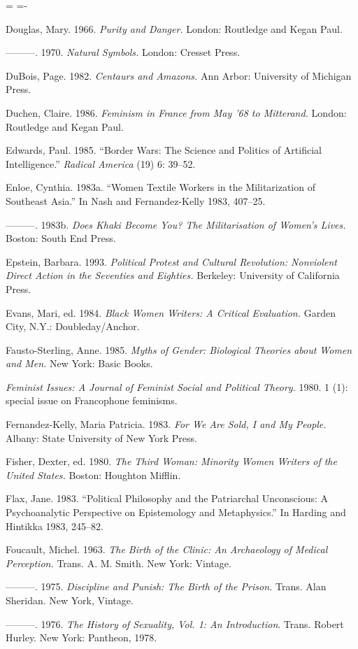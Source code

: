 \documentclass[DIV=12,%
               BCOR=10mm,%
               headinclude=false,%
               footinclude=false,open=any,%
               fontsize=11pt,%
               twoside,%
               paper=210mm:11in]%
               {scrbook}
\newenvironment*{amusebiblio}{
  \leftskip=\parindent
  \parindent=-\parindent
  \smallskip
  \indent
}{\smallskip}
\newcommand*{\Slash}{\slash\hspace{0pt}}
\begin{document}
\begin{amusebiblio}
Douglas, Mary. 1966. \emph{Purity and Danger.} London: Routledge and Kegan Paul.


———. 1970. \emph{Natural Symbols.} London: Cresset Press.


DuBois, Page. 1982. \emph{Centaurs and Amazons.} Ann Arbor: University of Michigan Press.


Duchen, Claire. 1986. \emph{Feminism in France from May ’68 to Mitterand.} London: Routledge and Kegan Paul.


Edwards, Paul. 1985. “Border Wars: The Science and Politics of Artificial Intelligence.” \emph{Radical America} (19) 6: 39–52.


Enloe, Cynthia. 1983a. “Women Textile Workers in the Militarization of Southeast Asia.” In Nash and Fernandez-Kelly 1983, 407–25.


———. 1983b. \emph{Does Khaki Become You? The Militarisation of Women’s Lives.} Boston: South End Press.


Epstein, Barbara. 1993. \emph{Political Protest and Cultural Revolution: Nonviolent Direct Action in the Seventies and Eighties.} Berkeley: University of California Press.


Evans, Mari, ed. 1984. \emph{Black Women Writers: A Critical Evaluation.} Garden City, N.Y.: Doubleday\Slash{}Anchor.


Fausto-Sterling, Anne. 1985. \emph{Myths of Gender: Biological Theories about Women and Men.} New York: Basic Books.


\emph{Feminist Issues: A Journal of Feminist Social and Political Theory.} 1980. 1 (1): special issue on Francophone feminisms.


Fernandez-Kelly, Maria Patricia. 1983. \emph{For We Are Sold, I and My People.} Albany: State University of New York Press.


Fisher, Dexter, ed. 1980. \emph{The Third Woman: Minority Women Writers of the United States.} Boston: Houghton Mifflin.


Flax, Jane. 1983. “Political Philosophy and the Patriarchal Unconscious: A Psychoanalytic Perspective on Epistemology and Metaphysics.” In Harding and Hintikka 1983, 245–82.


Foucault, Michel. 1963. \emph{The Birth of the Clinic: An Archaeology of Medical Perception.} Trans. A. M. Smith. New York: Vintage.


———. 1975. \emph{Discipline and Punish: The Birth of the Prison.} Trans. Alan Sheridan. New York, Vintage.


———. 1976. \emph{The History of Sexuality, Vol. 1: An Introduction}. Trans. Robert Hurley. New York: Pantheon, 1978.



\end{amusebiblio}
\end{document}
